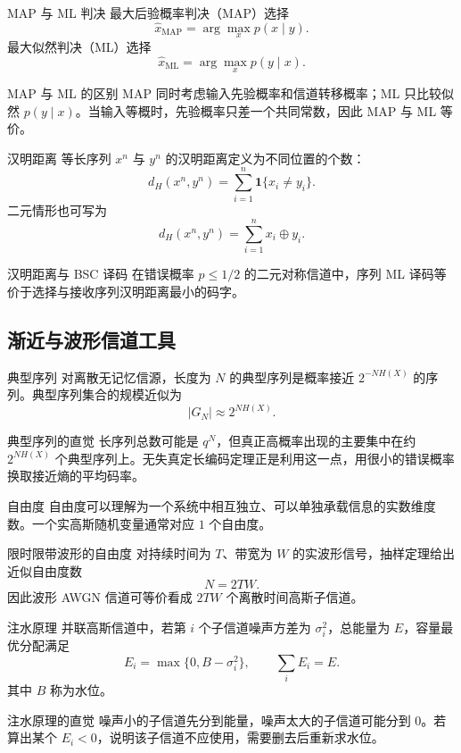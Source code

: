 \begin{definitionBox}{MAP 与 ML 判决}
最大后验概率判决（MAP）选择
\[
\hat x_{\mathrm{MAP}}=\arg\max_x p(x\mid y).
\]
最大似然判决（ML）选择
\[
\hat x_{\mathrm{ML}}=\arg\max_x p(y\mid x).
\]
\end{definitionBox}

\begin{keypoint}{MAP 与 ML 的区别}
MAP 同时考虑输入先验概率和信道转移概率；ML 只比较似然 $p(y\mid x)$。当输入等概时，先验概率只差一个共同常数，因此 MAP 与 ML 等价。
\end{keypoint}

\begin{definitionBox}{汉明距离}
等长序列 $x^n$ 与 $y^n$ 的汉明距离定义为不同位置的个数：
\[
d_H(x^n,y^n)=\sum_{i=1}^n \mathbf 1\{x_i\ne y_i\}.
\]
二元情形也可写为
\[
d_H(x^n,y^n)=\sum_{i=1}^n x_i\oplus y_i.
\]
\end{definitionBox}

\begin{keypoint}{汉明距离与 BSC 译码}
在错误概率 $p\le1/2$ 的二元对称信道中，序列 ML 译码等价于选择与接收序列汉明距离最小的码字。
\end{keypoint}

\subsection{渐近与波形信道工具}

\begin{definitionBox}{典型序列}
对离散无记忆信源，长度为 $N$ 的典型序列是概率接近 $2^{-NH(X)}$ 的序列。典型序列集合的规模近似为
\[
|G_N|\approx2^{NH(X)}.
\]
\end{definitionBox}

\begin{keypoint}{典型序列的直觉}
长序列总数可能是 $q^N$，但真正高概率出现的主要集中在约 $2^{NH(X)}$ 个典型序列上。无失真定长编码定理正是利用这一点，用很小的错误概率换取接近熵的平均码率。
\end{keypoint}

\begin{definitionBox}{自由度}
自由度可以理解为一个系统中相互独立、可以单独承载信息的实数维度数。一个实高斯随机变量通常对应 $1$ 个自由度。
\end{definitionBox}

\begin{formulaBox}{限时限带波形的自由度}
对持续时间为 $T$、带宽为 $W$ 的实波形信号，抽样定理给出近似自由度数
\[
N=2TW.
\]
因此波形 AWGN 信道可等价看成 $2TW$ 个离散时间高斯子信道。
\end{formulaBox}

\begin{definitionBox}{注水原理}
并联高斯信道中，若第 $i$ 个子信道噪声方差为 $\sigma_i^2$，总能量为 $E$，容量最优分配满足
\[
E_i=\max\{0,B-\sigma_i^2\},
\qquad
\sum_i E_i=E.
\]
其中 $B$ 称为水位。
\end{definitionBox}

\begin{keypoint}{注水原理的直觉}
噪声小的子信道先分到能量，噪声太大的子信道可能分到 $0$。若算出某个 $E_i<0$，说明该子信道不应使用，需要删去后重新求水位。
\end{keypoint}
